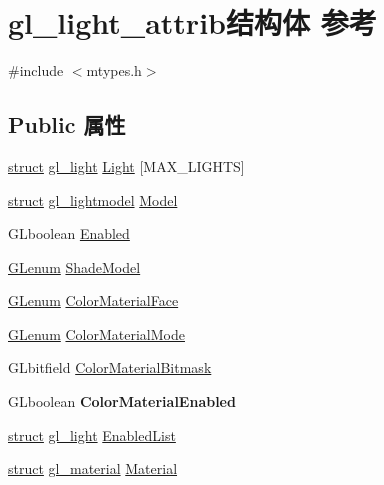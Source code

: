 \hypertarget{structgl__light__attrib}{}\section{gl\+\_\+light\+\_\+attrib结构体 参考}
\label{structgl__light__attrib}


{\ttfamily \#include $<$mtypes.\+h$>$}

\subsection*{Public 属性}
\begin{DoxyCompactItemize}
\item 
\hyperlink{interfacestruct}{struct} \hyperlink{structgl__light}{gl\+\_\+light} \hyperlink{structgl__light__attrib_ae8f370825d2741f96c74ae0a4dc13cd5}{Light} \mbox{[}M\+A\+X\+\_\+\+L\+I\+G\+H\+TS\mbox{]}
\item 
\hyperlink{interfacestruct}{struct} \hyperlink{structgl__lightmodel}{gl\+\_\+lightmodel} \hyperlink{structgl__light__attrib_a9248638db24a85cf31b6304346c35806}{Model}
\item 
G\+Lboolean \hyperlink{structgl__light__attrib_aef72c7536f36b8005a9b5dfd25e94f81}{Enabled}
\item 
\hyperlink{interfacevoid}{G\+Lenum} \hyperlink{structgl__light__attrib_a0c17126359bd9fa67abd5bffe18d7036}{Shade\+Model}
\item 
\hyperlink{interfacevoid}{G\+Lenum} \hyperlink{structgl__light__attrib_afbb1cfae4fb9a8b62e1a49762331f77f}{Color\+Material\+Face}
\item 
\hyperlink{interfacevoid}{G\+Lenum} \hyperlink{structgl__light__attrib_a9e5aa021a58f54ae539011484fa210eb}{Color\+Material\+Mode}
\item 
G\+Lbitfield \hyperlink{structgl__light__attrib_a825f1270289525290b0f54ad2bfec3a2}{Color\+Material\+Bitmask}
\item 
\mbox{\label{structgl__light__attrib_ab41ef6804d327d0a18941fbe0787154d}} 
G\+Lboolean {\bfseries Color\+Material\+Enabled}
\item 
\hyperlink{interfacestruct}{struct} \hyperlink{structgl__light}{gl\+\_\+light} \hyperlink{structgl__light__attrib_a088136e32437533f4dfed2aee7ee5de5}{Enabled\+List}
\end{DoxyCompactItemize}
\textbf{ }\par
\begin{DoxyCompactItemize}
\item 
\hyperlink{interfacestruct}{struct} \hyperlink{structgl__material}{gl\+\_\+material} \hyperlink{structgl__light__attrib_a61b333773d9847f6ae5ce17e11052e9d}{Material}
\end{DoxyCompactItemize}

